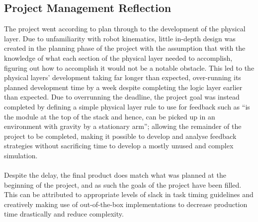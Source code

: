 \subsection{Project Management Reflection}
The project went according to plan through to the development of the physical layer. Due to unfamiliarity with robot kinematics, little in-depth design was created in the planning phase of the project with the assumption that with the knowledge of what each section of the physical layer needed to accomplish, figuring out how to accomplish it would not be a notable obstacle. This led to the physical layers’ development taking far longer than expected, over-running its planned development time by a week despite completing the logic layer earlier than expected. Due to overrunning the deadline, the project goal was instead completed by defining a simple physical layer rule to use for feedback such as “is the module at the top of the stack and hence, can be picked up in an environment with gravity by a stationary arm”; allowing the remainder of the project to be completed, making it possible to develop and analyse feedback strategies without sacrificing time to develop a mostly unused and complex simulation.
\\\\ 
Despite the delay, the final product does match what was planned at the beginning of the project, and as such the goals of the project have been filled. This can be attributed to appropriate levels of slack in task timing guidelines and creatively making use of out-of-the-box implementations to decrease production time drastically and reduce complexity.

